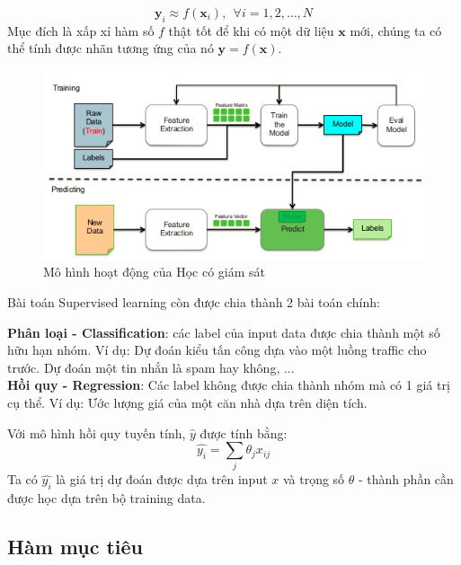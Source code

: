 \[ \mathbf{y}_i \approx f(\mathbf{x}_i), ~~ \forall i = 1, 2, \dots, N\] Mục đích là xấp xỉ hàm số \(f\) thật tốt để khi có một dữ liệu \(\mathbf{x}\) mới, chúng ta có thể tính được nhãn tương ứng của nó \( \mathbf{y} = f(\mathbf{x}) \). \\
\begin{figure}[H]
    \centering
    \includegraphics[scale=1.0]{supervised-learning}
    \caption{Mô hình hoạt động của Học có giám sát}
    \label{fig:my_labe3}
\end{figure}
\indent Bài toán Supervised learning còn được chia thành 2 bài toán chính: 
\begin{itemize}
\ii \textbf{Phân loại - Classification}: các label của input data được chia thành một số hữu hạn nhóm. Ví dụ: Dự đoán kiểu tấn công dựa vào một luồng traffic cho trước. Dự đoán một tin nhắn là spam hay không, ...\\
\ii \textbf{Hồi quy - Regression}: Các label không được chia thành nhóm mà có 1 giá trị cụ thể. Ví dụ: Ước lượng giá của một căn nhà dựa trên diện tích.
\end{itemize}
Với mô hình hồi quy tuyến tính, $\hat{y}$ được tính bằng:\\
\begin{equation}
    \hat{y_i}= \sum_{j} \theta_j x_{ij}
\end{equation}
Ta có $\hat{y_i}$ là giá trị dự đoán được dựa trên input $x$ và trọng số $\theta$ - thành phần cần được học dựa trên bộ training data. 

\subsection{Hàm mục tiêu}

